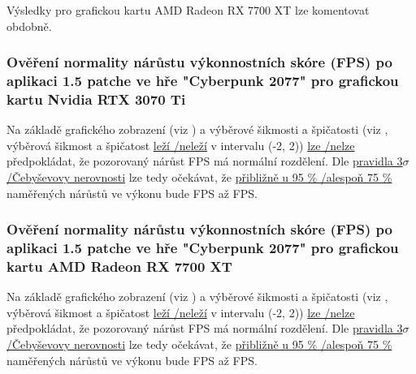 \vspace{1em}
\noindent
Výsledky pro grafickou kartu AMD Radeon RX 7700 XT lze komentovat obdobně.

\subsubsection*{Ověření normality nárůstu výkonnostních skóre (FPS) po aplikaci 1.5 patche ve hře "Cyberpunk 2077" pro grafickou kartu Nvidia RTX 3070 Ti}

Na základě grafického zobrazení (viz \TODO) a výběrové šikmosti a špičatosti (viz , výběrová šikmost a špičatost \ul{leží \slash neleží} 
v intervalu (-2, 2)) \ul{lze \slash nelze} předpokládat, že pozorovaný nárůst FPS má normální rozdělení. Dle \ul{pravidla 3$\sigma$ \slash Čebyševovy nerovnosti} 
lze tedy očekávat, že \ul{přibližně u 95 \% \slash alespoň 75 \%} naměřených nárůstů ve výkonu bude  FPS až  FPS\@.

\subsubsection*{Ověření normality nárůstu výkonnostních skóre (FPS) po aplikaci 1.5 patche ve hře "Cyberpunk 2077" pro grafickou kartu AMD Radeon RX 7700 XT}

Na základě grafického zobrazení (viz \TODO) a výběrové šikmosti a špičatosti (viz , výběrová šikmost a špičatost \ul{leží \slash neleží} 
v intervalu (-2, 2)) \ul{lze \slash nelze} předpokládat, že pozorovaný nárůst FPS má normální rozdělení. Dle \ul{pravidla 3$\sigma$ \slash Čebyševovy nerovnosti} 
lze tedy očekávat, že \ul{přibližně u 95 \% \slash alespoň 75 \%} naměřených nárůstů ve výkonu bude  FPS až  FPS\@.

\endinput